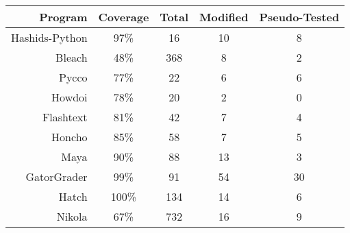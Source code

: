 \renewcommand{\arraystretch}{1.2}

\begin{table}[H]
\centering

%
\huge

\begin{tabular}{rcccc}


  Program & Coverage & Total & Modified & Pseudo-Tested \\
  \toprule

  Hashids-Python & 97\% & 16 & 10 & 8 \\

  Bleach & 48\% & 368 & 8 & 2 \\

  Pycco & 77\% & 22 & 6 & 6 \\

  Howdoi & 78\% & 20 & 2 & 0 \\

  Flashtext & 81\% & 42 & 7 & 4 \\

  Honcho & 85\% & 58 & 7 & 5 \\

  Maya & 90\% & 88 & 13 & 3 \\

  GatorGrader & 99\% & 91 & 54 & 30 \\

  Hatch & 100\% & 134 & 14 & 6 \\

  Nikola & 67\% & 732 & 16 & 9 \\

  \bottomrule

\end{tabular}

\end{table}
